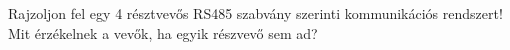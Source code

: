 \begin{example}

Rajzoljon fel egy 4 résztvevős RS485 szabvány szerinti kommunikációs rendszert! Mit érzékelnek a vevők, ha egyik részvevő sem ad?

\tcbline
\vspace{1mm}

\solution

\end{example}